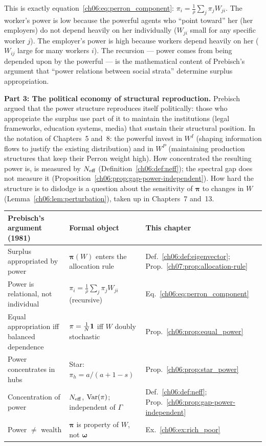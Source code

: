 \documentclass[../structural_economics_book.tex]{subfiles}
\begin{document}
This is exactly equation~\eqref{ch06:eq:perron_component}: $\pi_i = \frac{1}{\rho}\sum_j \pi_j W_{ji}$. The worker's power is low because the powerful agents who ``point toward'' her (her employers) do not depend heavily on her individually ($W_{ji}$ small for any specific worker $j$). The employer's power is high because workers depend heavily on her ($W_{ij}$ large for many workers $i$). The recursion --- power comes from being depended upon by the powerful --- is the mathematical content of Prebisch's argument that ``power relations between social strata'' determine surplus appropriation.

\textbf{Part 3: The political economy of structural reproduction.} Prebisch argued that the power structure reproduces itself politically: those who appropriate the surplus use part of it to maintain the institutions (legal frameworks, education systems, media) that sustain their structural position. In the notation of Chapters~5 and~8: the powerful invest in $W^I$ (shaping information flows to justify the existing distribution) and in $W^P$ (maintaining production structures that keep their Perron weight high). How concentrated the resulting power is, is measured by $N_{\text{eff}}$ (Definition~\ref{ch06:def:neff}); the spectral gap does not measure it (Proposition~\ref{ch06:prop:gap-power-independent}). How hard the structure is to dislodge is a question about the sensitivity of $\boldsymbol{\pi}$ to changes in $W$ (Lemma~\ref{ch06:lem:perturbation}), taken up in Chapters~7 and~13.

\begin{center}
\begin{tabularx}{\textwidth}{LLL}
\toprule
\textbf{Prebisch's argument (1981)} & \textbf{Formal object} & \textbf{This chapter} \\
\midrule
Surplus appropriated by power & $\boldsymbol{\pi}(W)$ enters the allocation rule & Def.~\ref{ch06:def:eigenvector}; Prop.~\ref{ch07:prop:allocation-rule} \\
Power is relational, not individual & $\pi_i = \frac{1}{\rho}\sum_j \pi_j W_{ji}$ (recursive) & Eq.~\eqref{ch06:eq:perron_component} \\
Equal appropriation iff balanced dependence & $\pi = \frac{1}{N}\mathbf{1}$ iff $W$ doubly stochastic & Prop.~\ref{ch06:prop:equal_power} \\
Power concentrates in hubs & Star: $\pi_h = a/(a+1-s)$ & Prop.~\ref{ch06:prop:star_power} \\
Concentration of power & $N_{\text{eff}}$, $\operatorname{Var}(\pi)$; independent of $\Gamma$ & Def.~\ref{ch06:def:neff}; Prop.~\ref{ch06:prop:gap-power-independent} \\
Power $\neq$ wealth & $\boldsymbol{\pi}$ is property of $W$, not $\boldsymbol{\omega}$ & Ex.~\ref{ch06:ex:rich_poor} \\
\bottomrule
\end{tabularx}
\end{center}
\end{document}
